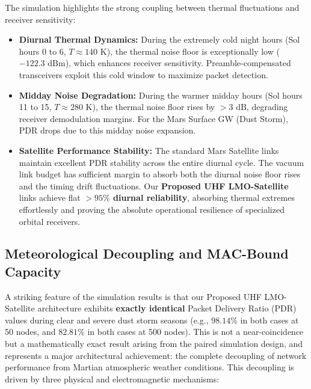\documentclass{ijuc}
\begin{document}
The simulation highlights the strong coupling between thermal fluctuations and receiver sensitivity:
\begin{itemize}
    \item \textbf{Diurnal Thermal Dynamics:} During the extremely cold night hours (Sol hours 0 to 6, $T \approx 140\text{ K}$), the thermal noise floor is exceptionally low ($-122.3\text{ dBm}$), which enhances receiver sensitivity. Preamble-compensated transceivers exploit this cold window to maximize packet detection.
    \item \textbf{Midday Noise Degradation:} During the warmer midday hours (Sol hours 11 to 15, $T \approx 280\text{ K}$), the thermal noise floor rises by $>3\text{ dB}$, degrading receiver demodulation margins. For the Mars Surface GW (Dust Storm), PDR drops due to this midday noise expansion.
    \item \textbf{Satellite Performance Stability:} The standard Mars Satellite links maintain excellent PDR stability across the entire diurnal cycle. The vacuum link budget has sufficient margin to absorb both the diurnal noise floor rises and the timing drift fluctuations. Our \textbf{Proposed UHF LMO-Satellite} links achieve flat \textbf{$>95\%$ diurnal reliability}, absorbing thermal extremes effortlessly and proving the absolute operational resilience of specialized orbital receivers.
\end{itemize}

\subsection{Meteorological Decoupling and MAC-Bound Capacity}
A striking feature of the simulation results is that our Proposed UHF LMO-Satellite architecture exhibits \textbf{exactly identical} Packet Delivery Ratio (PDR) values during clear and severe dust storm seasons (e.g., $98.14\%$ in both cases at 50 nodes, and $82.81\%$ in both cases at 500 nodes). This is not a near-coincidence but a mathematically exact result arising from the paired simulation design, and represents a major architectural achievement: the complete decoupling of network performance from Martian atmospheric weather conditions. This decoupling is driven by three physical and electromagnetic mechanisms:
\end{document}
